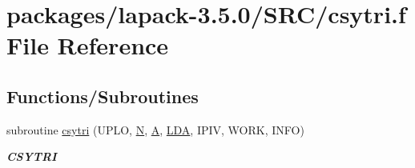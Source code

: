 \hypertarget{csytri_8f}{}\section{packages/lapack-\/3.5.0/\+S\+R\+C/csytri.f File Reference}
\label{csytri_8f}
\subsection*{Functions/\+Subroutines}
\begin{DoxyCompactItemize}
\item 
subroutine \hyperlink{group__complexSYcomputational_ga7f05f7e397f26b4b909379193f3530ab}{csytri} (U\+P\+L\+O, \hyperlink{polmisc_8c_a0240ac851181b84ac374872dc5434ee4}{N}, \hyperlink{classA}{A}, \hyperlink{example__user_8c_ae946da542ce0db94dced19b2ecefd1aa}{L\+D\+A}, I\+P\+I\+V, W\+O\+R\+K, I\+N\+F\+O)
\begin{DoxyCompactList}\small\item\em {\bfseries C\+S\+Y\+T\+R\+I} \end{DoxyCompactList}\end{DoxyCompactItemize}
